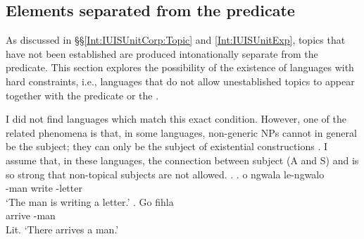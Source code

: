 %


\subsection{Elements separated from the predicate}\label{Disc:HardConst:Separated}

As discussed in \S\S \ref{Int:IUISUnitCorp:Topic} and \ref{Int:IUISUnitExp},
topics that have not been established are produced intonationally separate from the predicate.
This section explores the possibility of the existence of
languages with hard constraints,
i.e., languages that do not allow unestablished topics to appear together with the predicate or the .

I did not find languages which match this exact condition.
However, one of the related phenomena is that, in some languages,
 non-generic NPs cannot in general be the subject;
they can only be the subject of existential constructions \cite[173ff.]{givon76}.
I assume that, in these languages,
the connection between subject (A and S) and  is so strong
that non-topical subjects are not allowed.
%
\ex.
 \ag.  o ngwala le-ngwalo \\
      -man  write -letter \\
      `The man is writing a letter.'
 \bg. Go fihla  \\
       arrive -man \\
      Lit. `There arrives a man.'
     \hfill{\cite[171]{zerbian06}}

